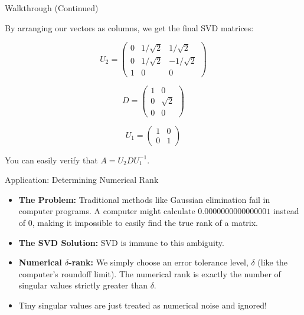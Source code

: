 \documentclass{beamer}
\begin{document}
\begin{frame}{Walkthrough (Continued)}
\begin{example}[Continued]
    By arranging our vectors as columns, we get the final SVD matrices:
    
    \[ U_2 = \begin{pmatrix} 0 & 1/\sqrt{2} & 1/\sqrt{2} \\ 0 & 1/\sqrt{2} & -1/\sqrt{2} \\ 1 & 0 & 0 \end{pmatrix} \]
    
    \[ D = \begin{pmatrix} 1 & 0 \\ 0 & \sqrt{2} \\ 0 & 0 \end{pmatrix} \]
    
    \[ U_1 = \begin{pmatrix} 1 & 0 \\ 0 & 1 \end{pmatrix} \]
    
    You can easily verify that $A = U_2 D U_1^{-1}$.
    \end{example}
\end{frame}

\begin{frame}{Application: Determining Numerical Rank}
    \begin{itemize}
        \item \textbf{The Problem:} Traditional methods like Gaussian elimination fail in computer programs. A computer might calculate $0.0000000000000001$ instead of $0$, making it impossible to easily find the true rank of a matrix.
        \item \textbf{The SVD Solution:} SVD is immune to this ambiguity. 
        \item \textbf{Numerical $\delta$-rank:} We simply choose an error tolerance level, $\delta$ (like the computer's roundoff limit). The numerical rank is exactly the number of singular values strictly greater than $\delta$.
        \item Tiny singular values are just treated as numerical noise and ignored!
    \end{itemize}
\end{frame}
\end{document}
